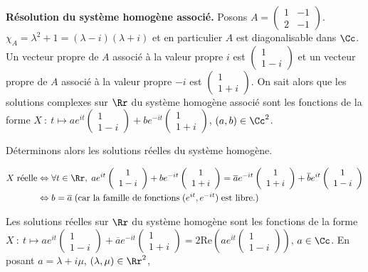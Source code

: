{\begin{enumerate}
{\textbf{Résolution du système homogène associé.} Posons $A=\left(
\begin{array}{cc}
1&-1\\
2&-1
\end{array}
\right)$. $\chi_A=\lambda^2+1=(\lambda-i)(\lambda+i)$ et en particulier $A$ est diagonalisable dans $\Cc$. Un vecteur propre de $A$ associé à la valeur propre $i$ est $\left(
\begin{array}{c}
1\\
1-i
\end{array}
\right)$ et un vecteur propre de $A$ associé à la valeur propre $-i$ est $\left(
\begin{array}{c}
1\\
1+i
\end{array}
\right)$. On sait alors que les solutions complexes sur $\Rr$ du système homogène associé sont les fonctions de la forme $X~:~t\mapsto ae^{it}\left(
\begin{array}{c}
1\\
1-i
\end{array}
\right)+be^{-it}\left(
\begin{array}{c}
1\\
1+i
\end{array}
\right)$, $(a,b)\in\Cc^2$.

Déterminons alors les solutions réelles du système homogène.

\begin{align*}\ensuremath
X\;\text{réelle}&\Leftrightarrow\forall t\in\Rr,\;ae^{it}\left(
\begin{array}{c}
1\\
1-i
\end{array}
\right)+be^{-it}\left(
\begin{array}{c}
1\\
1+i
\end{array}
\right)=\overline{a}e^{-it}\left(
\begin{array}{c}
1\\
1+i
\end{array}
\right)+\overline{b}e^{it}\left(
\begin{array}{c}
1\\
1-i
\end{array}
\right)\\
 &\Leftrightarrow b=\overline{a}\;(\text{car la famille de fonctions}\;(e^{it},e^{-it})\;\text{est libre}.)
\end{align*}

Les solutions réelles sur $\Rr$ du système homogène sont les fonctions de la forme $X~:~t\mapsto ae^{it}\left(
\begin{array}{c}
1\\
1-i
\end{array}
\right)+\overline{a}e^{-it}\left(
\begin{array}{c}
1\\
1+i
\end{array}
\right)=2\text{Re}\left(ae^{it}\left(
\begin{array}{c}
1\\
1-i
\end{array}
\right)\right)$, $a\in\Cc$. En posant $a=\lambda+i\mu$, $(\lambda,\mu)\in\Rr^2$, 

}
\end{enumerate}}
